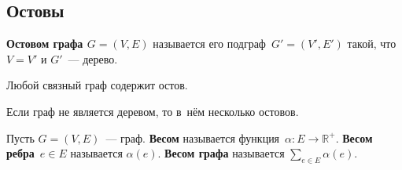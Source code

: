 \subsection{Остовы}
 \textbf{Остовом графа $G = (V, E)$} называется его подграф~$G' = (V', E')$ такой, что $V = V'$ и $G'$~--- дерево.

\begin{statement}
Любой связный граф содержит остов.
\end{statement}

\begin{statement}
Если граф не является деревом, то в~нём несколько остовов.
\end{statement}

Пусть $G = (V, E)$~--- граф.
\textbf{Весом} называется функция~$\alpha \colon E \to \mathbb R^+$.
\textbf{Весом ребра}~$e \in E$ называется $\alpha(e)$.
 \textbf{Весом графа} называется $\displaystyle \sum_{e \in E} \alpha(e)$.

